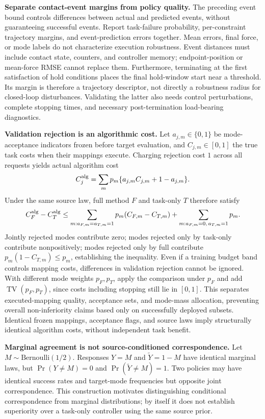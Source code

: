 \textbf{Separate contact-event margins from policy quality.} The preceding event bound controls differences between actual and predicted
events, without guaranteeing successful events. Report task-failure probability, per-constraint trajectory margins,
and event-prediction errors together. Mean errors, final force, or mode labels do not characterize execution robustness.
Event distances must include contact state, counters, and controller memory;
endpoint-position or mean-force RMSE cannot replace them.
Furthermore, terminating at the first satisfaction of hold conditions places the final hold-window start near a threshold.
Its margin is therefore a trajectory descriptor, not directly a robustness radius for closed-loop disturbances. Validating the latter
also needs control perturbations, complete stopping times, and necessary post-termination load-bearing diagnostics.

\textbf{Validation rejection is an algorithmic cost.} Let $a_{j,m}\in\{0,1\}$ be mode-acceptance indicators frozen before target evaluation,
and $C_{j,m}\in[0,1]$ the true task costs when their mappings execute.
Charging rejection cost $1$ across all requests yields actual algorithm cost
\[
 C_j^{\rm alg}=\sum_m p_m\{a_{j,m}C_{j,m}+1-a_{j,m}\}.
\]
Under the same source law, full method $F$ and task-only $T$ therefore satisfy
\[
 C_F^{\rm alg}-C_T^{\rm alg}
 \le \sum_{m:a_{F,m}=a_{T,m}=1}p_m(C_{F,m}-C_{T,m})
       +\sum_{m:a_{F,m}=0,\,a_{T,m}=1}p_m.
\]
Jointly rejected modes contribute zero; modes rejected only by task-only contribute nonpositively; modes rejected only by full
contribute $p_m(1-C_{T,m})\le p_m$, establishing the inequality. Even if a training budget band controls
mapping costs, differences in validation rejection cannot be ignored. With different
mode weights $p_F,p_T$, apply the comparison under $p_F$ and add
$\operatorname{TV}(p_F,p_T)$, since costs including stopping still lie in $[0,1]$.
This separates executed-mapping quality, acceptance sets, and mode-mass allocation, preventing overall non-inferiority claims
based only on successfully deployed subsets. Identical frozen mappings, acceptance flags, and source laws imply
structurally identical algorithm costs, without independent task benefit.

\textbf{Marginal agreement is not source-conditioned correspondence.} Let $M\sim\mathrm{Bernoulli}(1/2)$.
Responses $Y=M$ and $\widetilde Y=1-M$ have identical marginal laws, but
$\Pr(Y\ne M)=0$ and $\Pr(\widetilde Y\ne M)=1$.
Two policies may have identical success rates and target-mode frequencies but opposite joint correspondence.
This construction motivates distinguishing conditional correspondence from marginal distributions; by itself it does not establish
superiority over a task-only controller using the same source prior.

